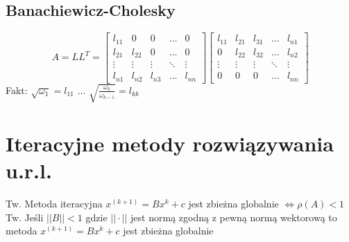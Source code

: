 \documentclass[10pt,twocolumn]{article}
\begin{document}
\begin{flushleft}
\subsection{Banachiewicz-Cholesky}
$$A = LL^T =
\begin{bmatrix}
    l_{11} & 0 & 0 & \dots  & 0 \\
    l_{21} & l_{22} & 0 & \dots  & 0 \\
    \vdots & \vdots & \vdots & \ddots & \vdots \\
    l_{n1} & l_{n2} & l_{n3} & \dots  & l_{nn}
\end{bmatrix}
\begin{bmatrix}
    l_{11} & l_{21} & l_{31} & \dots  & l_{n1} \\
    0 & l_{22} & l_{32} & \dots & l_{n2} \\
    \vdots & \vdots & \vdots & \ddots & \vdots \\
    0 & 0 & 0 & \dots  & l_{nn} 
\end{bmatrix}
$$
Fakt: $\sqrt{\omega_1} = l_{11}$ ... $\sqrt{\frac{\omega_{k}}{\omega_{k-1}}} = l_{kk}$ 

\section{Iteracyjne metody rozwiązywania u.r.l.}
Tw. Metoda iteracyjna $x^{(k+1)}=Bx^k+c$ jest zbieżna globalnie $\Leftrightarrow \rho(A) < 1$\\
Tw. Jeśli $||B|| < 1$ gdzie $||\cdot||$ jest normą zgodną z pewną normą wektorową to metoda $x^{(k+1)}=Bx^k+c$ jest zbieżna globalnie\\


\end{flushleft}
\end{document}
